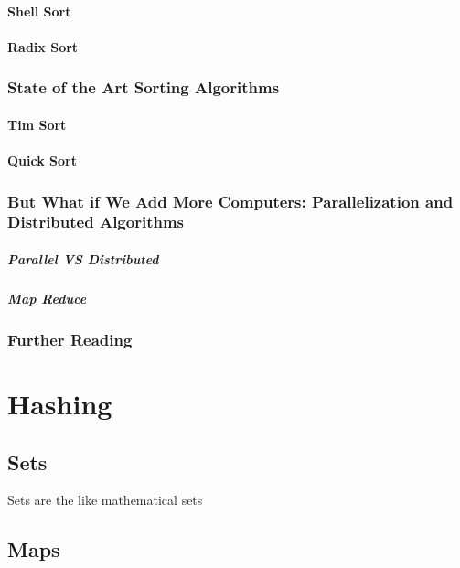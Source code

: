 \documentclass[10pt,a4paper]{book}
\begin{document}
\subsection{Shell Sort}

\subsection{Radix Sort}

\section{State of the Art Sorting Algorithms}

\subsection{Tim Sort}
\subsection{Quick Sort}
\section{But What if We Add More Computers: Parallelization and Distributed Algorithms}



\subsubsection{Parallel VS Distributed}

\subsubsection{Map Reduce }


\section{Further Reading}

\part{Hashing}

\chapter{Sets}
Sets are the like mathematical sets


\chapter{Maps}
\end{document}
